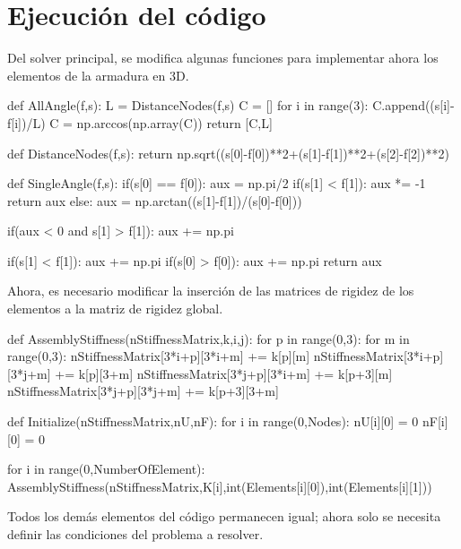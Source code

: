 \documentclass[12pt,a3paper]{article}
\begin{document}
\section{Ejecución del código}
Del solver principal, se modifica algunas funciones para implementar ahora los elementos de la armadura en 3D.
\begin{pyglist}[language=python,caption={Cálculo de la longitud y el ángulo entre nodos},style=pastie]
def AllAngle(f,s):
    L = DistanceNodes(f,s)
    C = []
    for i in range(3):
        C.append((s[i]-f[i])/L)
    C = np.arccos(np.array(C))
    return [C,L]

def DistanceNodes(f,s):
    return np.sqrt((s[0]-f[0])**2+(s[1]-f[1])**2+(s[2]-f[2])**2)

def SingleAngle(f,s):
    if(s[0] == f[0]):
        aux = np.pi/2
        if(s[1] < f[1]):
             aux *= -1
        return aux
    else:
        aux = np.arctan((s[1]-f[1])/(s[0]-f[0]))
        
    if(aux < 0 and s[1] > f[1]):
        aux += np.pi
        
    if(s[1] < f[1]):
        aux += np.pi
        if(s[0] > f[0]):
            aux += np.pi
    return aux
\end{pyglist}
Ahora, es necesario modificar la inserción de las matrices de rigidez de los elementos a la matriz de rigidez global.
\begin{pyglist}[language=python,caption={Ensamble de la matriz de rigidez},style=pastie]
def AssemblyStiffness(nStiffnessMatrix,k,i,j):
    for p in range(0,3):
        for m in range(0,3):
            nStiffnessMatrix[3*i+p][3*i+m] += k[p][m]
            nStiffnessMatrix[3*i+p][3*j+m] += k[p][3+m]
            nStiffnessMatrix[3*j+p][3*i+m] += k[p+3][m]
            nStiffnessMatrix[3*j+p][3*j+m] += k[p+3][3+m]
 
def Initialize(nStiffnessMatrix,nU,nF):
    for i in range(0,Nodes):
        nU[i][0] = 0
        nF[i][0] = 0
        
    for i in range(0,NumberOfElement):
        AssemblyStiffness(nStiffnessMatrix,K[i],int(Elements[i][0]),int(Elements[i][1]))
\end{pyglist}
Todos los demás elementos del código permanecen igual; ahora solo se necesita definir las condiciones del problema a resolver.
\end{document}
